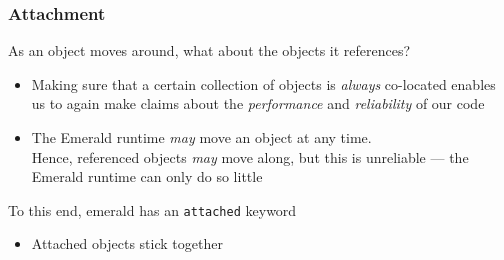 \begin{frame}

\frametitle{Attachment}

\begin{center}

As an object moves around, what about the objects it references?

\end{center}

\vspace{\fill}

\begin{itemize}

\item Making sure that a certain collection of objects is
\emph{always} co-located enables us to again make claims about the
\emph{performance} and \emph{reliability} of our code

\item The Emerald runtime \emph{may} move an object at any time.  \\
Hence, referenced objects \emph{may} move along, but this is
unreliable --- the Emerald runtime can only do so little

\end{itemize}

\vspace{\fill}

\begin{center}

To this end, emerald has an \lstinline{attached} keyword

\end{center}

\begin{itemize}

\item Attached objects stick together

\end{itemize}

\end{frame}
